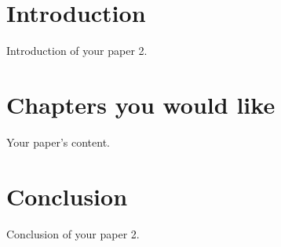 
\section{Introduction}

Introduction of your paper 2.

\section{Chapters you would like}

Your paper's content.

\section{Conclusion}

Conclusion of your paper 2.